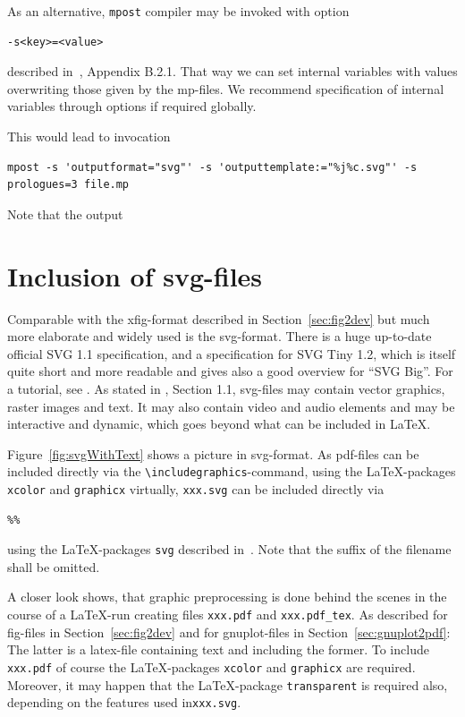 \documentclass[12pt]{book}
\begin{document}
As an alternative, {\tt mpost} compiler may be invoked with option 
%
\begin{verbatim}
-s<key>=<value>
\end{verbatim}
%
described in~\cite{MPost}, Appendix B.2.1. 
That way we can set internal variables with values 
overwriting those given by the mp-files. 
We recommend specification of internal variables through options 
if required globally. 

This would lead to invocation 
%
\begin{Verbatim}[fontsize=\scriptsize]
mpost -s 'outputformat="svg"' -s 'outputtemplate:="%j%c.svg"' -s prologues=3 file.mp
\end{Verbatim}

Note that the output 

\section{Inclusion of svg-files}\label{sec:picSvg}

Comparable with the xfig-format described in Section~\ref{sec:fig2dev} 
but much more elaborate and widely used is the \gls{svg}-format. 
There is a huge up-to-date official SVG 1.1 specification, \cite{Svg11} 
and a specification for SVG Tiny 1.2, 
\cite{Svg12Tiny} which is itself quite short and more readable 
and gives also a good overview for ``SVG Big''. 
For a tutorial, see \cite{SvgTut}. 
As stated in \cite{Svg12Tiny}, Section 1.1, 
svg-files may contain vector graphics, raster images and text. 
It may also contain video and audio elements 
and may be interactive and dynamic, 
which goes beyond what can be included in \LaTeX. 

Figure~\ref{fig:svgWithText} shows a picture in \gls{svg}-format. 
As pdf-files can be included directly 
via the {\tt\textbackslash includegraphics}-command, 
using the \LaTeX-packages {\tt xcolor} and {\tt graphicx} 
virtually, 
{\tt xxx.svg} can be included directly via 
\begin{verbatim}
%%
\end{verbatim}
%
using the \LaTeX-packages {\tt svg} described in~\cite{SvgP}. 
Note that the suffix of the filename shall be omitted. 

A closer look shows, that graphic preprocessing is done behind the scenes 
in the course of a \LaTeX-run 
creating files {\tt xxx.pdf} and {\tt xxx.pdf\_tex}. 
As described for fig-files in Section~\ref{sec:fig2dev} 
and for gnuplot-files in Section~\ref{sec:gnuplot2pdf}: 
The latter is a latex-file containing text 
and including the former. 
To include {\tt xxx.pdf} 
of course the \LaTeX-packages {\tt xcolor} and {\tt graphicx} 
are required. 
Moreover, it may happen that the \LaTeX-package {\tt transparent} 
is required also, depending on the features used in{\tt xxx.svg}. 
\end{document}
